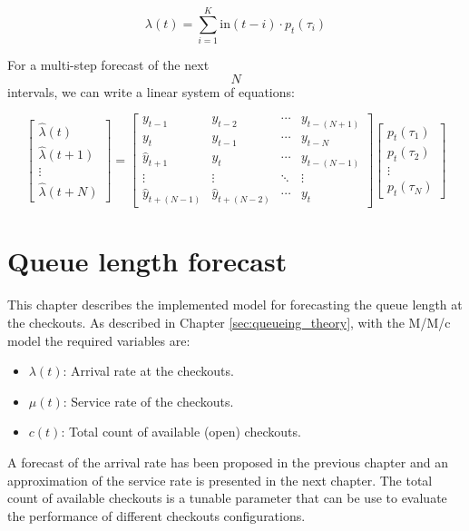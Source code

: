 $$ \lambda(t) = \sum_{i=1}^{K} \text{in}(t-i) \cdot p_t(\tau_i) $$

For a multi-step forecast of the next $$ N $$ intervals, we can write a linear system of equations:

\[
  \begin{bmatrix}\hat{\lambda}(t) \\ \hat{\lambda}(t+1) \\ \vdots \\ \hat{\lambda}(t+N)\end{bmatrix}
  =
  \begin{bmatrix}
    y_{t-1}           & y_{t-2}           & \cdots & y_{t-(N+1)} \\
    y_{t}             & y_{t-1}           & \cdots & y_{t-N}     \\
    \hat{y}_{t+1}     & y_{t}             & \cdots & y_{t-(N-1)} \\
    \vdots            & \vdots            & \ddots & \vdots      \\
    \hat{y}_{t+(N-1)} & \hat{y}_{t+(N-2)} & \cdots & y_{t}
  \end{bmatrix}
  \begin{bmatrix}p_t(\tau_1) \\ p_t(\tau_2) \\ \vdots \\ p_t(\tau_N)\end{bmatrix}
\]

\section{Queue length forecast}
\label{sec:queue_length_forecasting}
This chapter describes the implemented model for forecasting the queue length at the checkouts. As described in Chapter \ref{sec:queueing_theory}, with the M/M/c model the required variables are:
\begin{itemize}
  \item \( \lambda(t) \): Arrival rate at the checkouts.
  \item \( \mu(t) \): Service rate of the checkouts.
  \item \( c(t) \): Total count of available (open) checkouts.
\end{itemize}
A forecast of the arrival rate has been proposed in the previous chapter and an approximation of the service rate is presented in the next chapter. The total count of available checkouts is a tunable parameter that can be use to evaluate the performance of different checkouts configurations.

